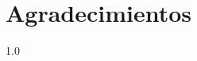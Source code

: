 %
\section*{Agradecimientos}
\label{sec::acknowledgement}


\vspace{\fill}
\begin{spacing}{1.0}
\end{spacing}




